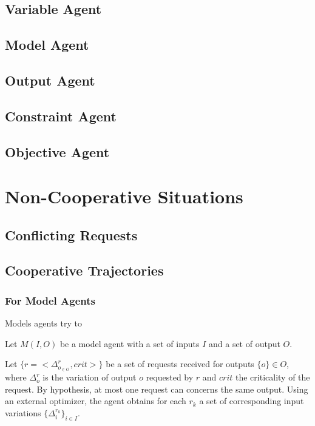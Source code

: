 \subsection{Variable Agent}

\subsection{Model Agent}

\subsection{Output Agent}

\subsection{Constraint Agent}

\subsection{Objective Agent}

\section{Non-Cooperative Situations}

\subsection{Conflicting Requests}

\subsection{Cooperative Trajectories}

\subsubsection{For Model Agents}

Models agents try to 

Let $M(I,O)$ be a model agent with a set of inputs $I$ and a set of output $O$.

Let $\{r = <\Delta_{o_{\in O}}^{r}, crit>\}$ be a set of  requests received for outputs $\{o\} \in O$, where $\Delta_{o}^{r}$ is the variation of output $o$ requested by $r$ and $crit$ the criticality of the request. By hypothesis, at most one request can concerns the same output.
Using an external optimizer, the agent obtains for each $r_k$ a set of corresponding input variations $\{\Delta_i^{r_k}\}_{i \in I}$.

